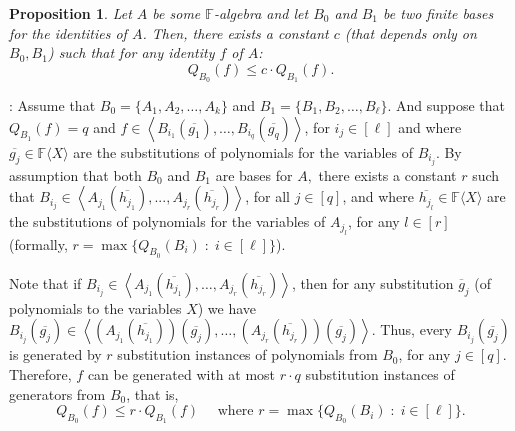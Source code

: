 \documentclass[12pt,reqno]{article}
\newtheorem{proposition}[theorem]{Proposition}
\newcommand\F{\ensuremath{\mathbb F}}
\newcommand{\cd}{\cdot}
\newcommand{\matd}{{\ensuremath{{\rm Mat}_d(\F)}}}
\newcommand{\freea}{\ensuremath{\F\langle X\rangle}}
\newenvironment{proof}{\QuadSpace\par\noindent{\bf Proof}:}{\EndProof\HalfSpace}
\newcommand{\QuadSpace}{\vspace{0.25\baselineskip}}
\newcommand{\HalfSpace}{\vspace{0.5\baselineskip}}
\newcommand{\EndProof}{ \hfill \vrule width 1ex height 1ex depth 0pt }
\newcommand{\iddocomment}[2][]
{\todo[size=\tiny, caption={#2}, #1, linecolor=green!70!white,         backgroundcolor=blue!10!white,bordercolor=white]
{{#2}}}
\newcommand{\ideal}[1]{\ensuremath{\left\langle #1\right\rangle}}
\begin{document}
\begin{proposition}\label{prop:generate-means-less-Q}
Let $A$ be some \F-algebra and let $B_{0}$ and $B_1$ be two \emph{finite} bases for the identities of $A$. Then, there exists a constant $c$ (that depends only on $B_0,B_1$) such that for any identity $f$ of \(A\):
$$
Q_{B_0}(f)\le c \cd Q_{B_1}(f).
$$
\end{proposition}
\begin{proof}
Assume that $B_0=\{A_1,A_2,\ldots,A_k\}$ and $B_1=\{B_1,B_2,\ldots, B_\ell\}$. And suppose that $Q_{B_1}(f)=q$ and $f\in\ideal{B_{i_1}(\overline {g_1}),\ldots,B_{i_q}
(\overline {g_q})}$, for $i_j \in [\ell]$ and where $\overline {g_j}\in\freea$ are the substitutions of polynomials for the variables of $B_{i_j}$. By assumption that both $B_0$ and $B_1$ are bases for $A,$ there exists a constant $r$ such that $B_{i_j} \in \ideal{A_{j_1}(\overline {h_{j_1}}),...,A_{j_r}(\overline {h_{j_r}})}$, for all $j\in[q]$, and where $\overline {h_{j_l}}\in\freea$ are the substitutions of polynomials for the variables of $A_{j_l}$, for any $l\in[r]$ (formally, $r=\max\{Q_{B_0}(B_i)\;:\; i\in[\ell]\}$).

Note that if $B_{i_j}\in\ideal{A_{j_1}(\overline {h_{j_1}}),\ldots,A_{j_r}
(\overline {h_{j_r}})}$, then for any substitution $\overline g_j$ (of polynomials to the variables $X$) we
have $B_{i_j}(\overline{g_j})\in\ideal{\left(A_{j_1}(\overline {h_{j_1}})\right)(\overline {g_j}),\ldots,\left(A_{j_r}
(\overline {h_{j_r}})\right)(\overline {g_j})}$. Thus, every $  B_{i_j}(\overline{g_j})$ is generated by $r$ substitution instances of polynomials from $B_0$, for any $j\in[q]$. Therefore,  $f$ can be generated with at most $r\cd q $ substitution instances of generators from $B_0$, that is,
\begin{equation}\label{eq:propostion_generator_set}
  Q_{B_0}(f)\le r\cd Q_{B_1}(f)~~~~~~\text{where $r=\max\{Q_{B_0}(B_i)\;:\; i\in[\ell]\}$}.
\end{equation}
\end{proof}


\end{document}
